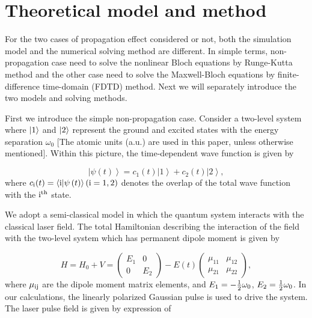 \documentclass[10pt,letterpaper]{article}
\begin{document}
\section{Theoretical model and method}
For the two cases of propagation effect considered or not, both the simulation model and the numerical solving method are different. In simple terms, non-propagation case need to solve the nonlinear Bloch equations by Runge-Kutta method and the other case need to solve the Maxwell-Bloch equations by finite-difference time-domain (FDTD) method. Next we will separately introduce the two models and solving methods. 

First we introduce the simple non-propagation case. Consider a two-level system where $\left| {\rm{1}} \right\rangle$ and $\left| {\rm{2}} \right\rangle$ represent the ground and excited states with the energy separation $ \omega_0 $ [The atomic units (a.u.) are used in this paper, unless otherwise mentioned]. Within this picture, the time-dependent wave function is given by

\begin{equation}
\left| {\psi \left( t \right)} \right\rangle  = {c_1}(t)\left| 1 \right\rangle  + {c_2}(t)\left| 2 \right\rangle,
\label{(eq1)}
\end{equation}
where $ c_{\rm{i}}(t) = \left\langle {\rm{i}} | \psi \left( t \right) \right\rangle(\rm{i}=1,2) $ denotes the overlap of the total wave function with the $\rm{i}^{th}$ state.

We adopt a semi-classical model in which the quantum system interacts with the classical laser field. The total Hamiltonian describing the interaction of the field with the two-level system which has permanent dipole moment is given by \cite{YangWeifeng-Two-Level-PLA-2007}

\begin{equation}
H = {H_0} + V = \left( {\begin{array}{*{20}{c}}
	{{E_1}}&0\\
	0&{{E_2}}
	\end{array}} \right) - E(t)\left( {\begin{array}{*{20}{c}}
	{{\mu _{11}}}&{{\mu _{12}}}\\
	{{\mu _{21}}}&{{\mu _{22}}}
	\end{array}} \right),
\label{eq2}
\end{equation}
where $ \mu_{\rm{ij}} $ are the dipole moment matrix elements, and ${E_1} =  - {1 \over 2}{\omega _0}$, ${E_2} =   {1 \over 2}{\omega _0}$. In our calculations, the linearly polarized Gaussian pulse is used to drive the system. The laser pulse field is given by expression of
\end{document}
